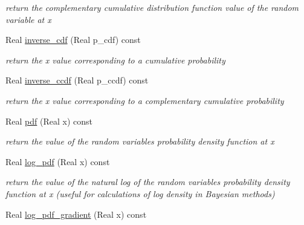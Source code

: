 \begin{DoxyCompactItemize}
\begin{DoxyCompactList}\small\item\em return the complementary cumulative distribution function value of the random variable at x \end{DoxyCompactList}\item 
Real \hyperlink{classPecos_1_1BoundedNormalRandomVariable_a918a1aac05ca349ea5313eebcba46c3e}{inverse\+\_\+cdf} (Real p\+\_\+cdf) const \label{classPecos_1_1BoundedNormalRandomVariable_a918a1aac05ca349ea5313eebcba46c3e}

\begin{DoxyCompactList}\small\item\em return the x value corresponding to a cumulative probability \end{DoxyCompactList}\item 
Real \hyperlink{classPecos_1_1BoundedNormalRandomVariable_afda003a1f59ff6930902cd5c8601f49b}{inverse\+\_\+ccdf} (Real p\+\_\+ccdf) const \label{classPecos_1_1BoundedNormalRandomVariable_afda003a1f59ff6930902cd5c8601f49b}

\begin{DoxyCompactList}\small\item\em return the x value corresponding to a complementary cumulative probability \end{DoxyCompactList}\item 
Real \hyperlink{classPecos_1_1BoundedNormalRandomVariable_a8ec69265f428e17c1707133cb137a819}{pdf} (Real x) const \label{classPecos_1_1BoundedNormalRandomVariable_a8ec69265f428e17c1707133cb137a819}

\begin{DoxyCompactList}\small\item\em return the value of the random variable\textquotesingle{}s probability density function at x \end{DoxyCompactList}\item 
Real \hyperlink{classPecos_1_1BoundedNormalRandomVariable_a6e2b6b6f13eedb2eb1ef3bc455a06392}{log\+\_\+pdf} (Real x) const \label{classPecos_1_1BoundedNormalRandomVariable_a6e2b6b6f13eedb2eb1ef3bc455a06392}

\begin{DoxyCompactList}\small\item\em return the value of the natural log of the random variable\textquotesingle{}s probability density function at x (useful for calculations of log density in Bayesian methods) \end{DoxyCompactList}\item 
Real \hyperlink{classPecos_1_1BoundedNormalRandomVariable_a5ccc16c04690f0c501f44c1ffae2bbd1}{log\+\_\+pdf\+\_\+gradient} (Real x) const \label{classPecos_1_1BoundedNormalRandomVariable_a5ccc16c04690f0c501f44c1ffae2bbd1}


\end{DoxyCompactItemize}
